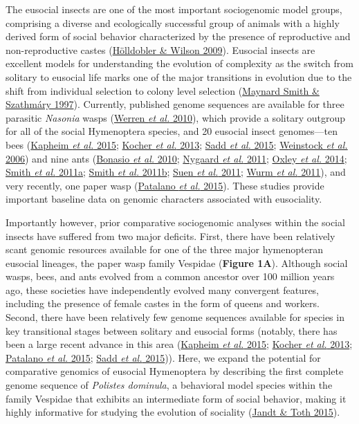 The eusocial insects are one of the most important sociogenomic model
groups, comprising a diverse and ecologically successful group of
animals with a highly derived form of social behavior characterized by
the presence of reproductive and non-reproductive castes
(\protect\hyperlink{ux5fENREFux5f19}{Hölldobler \& Wilson 2009}).
Eusocial insects are excellent models for understanding the evolution of
complexity as the switch from solitary to eusocial life marks one of the
major transitions in evolution due to the shift from individual
selection to colony level selection
(\protect\hyperlink{ux5fENREFux5f35}{Maynard Smith \& Szathmáry 1997}).
Currently, published genome sequences are available for three parasitic
\textit{Nasonia} wasps (\protect\hyperlink{ux5fENREFux5f70}{Werren
\textit{et al.} 2010}), which provide a solitary outgroup for all of the
social Hymenoptera species, and 20 eusocial insect genomes---ten bees
(\protect\hyperlink{ux5fENREFux5f24}{Kapheim \textit{et al.} 2015};
\protect\hyperlink{ux5fENREFux5f25}{Kocher \textit{et al.} 2013};
\protect\hyperlink{ux5fENREFux5f51}{Sadd \textit{et al.} 2015};
\protect\hyperlink{ux5fENREFux5f69}{Weinstock \textit{et al.} 2006}) and
nine ants (\protect\hyperlink{ux5fENREFux5f5}{Bonasio \textit{et al.}
2010}; \protect\hyperlink{ux5fENREFux5f37}{Nygaard \textit{et al.} 2011};
\protect\hyperlink{ux5fENREFux5f40}{Oxley \textit{et al.} 2014};
\protect\hyperlink{ux5fENREFux5f54}{Smith \textit{et al.} 2011a};
\protect\hyperlink{ux5fENREFux5f55}{Smith \textit{et al.} 2011b};
\protect\hyperlink{ux5fENREFux5f57}{Suen \textit{et al.} 2011};
\protect\hyperlink{ux5fENREFux5f74}{Wurm \textit{et al.} 2011}), and very
recently, one paper wasp (\protect\hyperlink{ux5fENREFux5f43}{Patalano
\textit{et al.} 2015}). These studies provide important baseline data on
genomic characters associated with eusociality.

Importantly however, prior comparative sociogenomic analyses within the
social insects have suffered from two major deficits. First, there have
been relatively scant genomic resources available for one of the three
major hymenopteran eusocial lineages, the paper wasp family Vespidae
(\textbf{Figure 1A}). Although social wasps, bees, and ants evolved from
a common ancestor over 100 million years ago, these societies have
independently evolved many convergent features, including the presence
of female castes in the form of queens and workers. Second, there have
been relatively few genome sequences available for species in key
transitional stages between solitary and eusocial forms (notably, there
has been a large recent advance in this area
(\protect\hyperlink{ux5fENREFux5f24}{Kapheim \textit{et al.} 2015};
\protect\hyperlink{ux5fENREFux5f25}{Kocher \textit{et al.} 2013};
\protect\hyperlink{ux5fENREFux5f43}{Patalano \textit{et al.} 2015};
\protect\hyperlink{ux5fENREFux5f51}{Sadd \textit{et al.} 2015})). Here, we
expand the potential for comparative genomics of eusocial Hymenoptera by
describing the first complete genome sequence of \textit{Polistes
dominula}, a behavioral model species within the family Vespidae that
exhibits an intermediate form of social behavior, making it highly
informative for studying the evolution of sociality
(\protect\hyperlink{ux5fENREFux5f21}{Jandt \& Toth 2015}).

